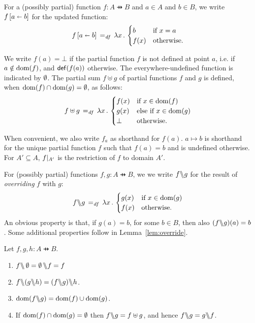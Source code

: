 \documentclass[11pt]{report}
\begin{document}
For a (possibly partial) function $f : A \pfun B$ and $a \in A$ and $b \in B$, we write $f \left[ a \shortleftarrow b \right]$ for the updated function: \[ f \left[ a \shortleftarrow b \right] \operatorname{\;=_{\mathit{df}}\;} \lambda x\,.\, \begin{cases}
  b & \text{if $x = a$} \\
  f(x) & \text{otherwise.}
\end{cases}\] 

We write $f(a) = \bot$ if the partial function $f$ is not defined at point $a$, i.e. if $a \notin \operatorname{\mathrm{dom}}(f)$, and $\mathsf{def}(f(a))$ otherwise. The everywhere-undefined function is indicated by $\operatorname{\emptyset}$. The partial sum $f \uplus g$ of partial functions $f$ and $g$ is defined, when $\operatorname{\mathrm{dom}}(f) \cap \operatorname{\mathrm{dom}}(g) = \operatorname{\emptyset}$, as follows: \[ f \uplus g \operatorname{\;=_{\mathit{df}}\;} \lambda x\,.\,\begin{cases}
    f(x) & \text{if $x \in \operatorname{\mathrm{dom}}(f)$} \\
    g(x) & \text{else if $x \in \operatorname{\mathrm{dom}}(g)$} \\
    \bot & \text{otherwise.}
\end{cases}\]

 When convenient, we also write $f_a$ as shorthand for $f(a)$. $a \mapsto b$ is shorthand for the unique partial function $f$ such that $f(a) = b$ and is undefined otherwise. For $A' \subseteq A$, $f |_{A'}$ is the restriction of $f$ to domain $A'$. 

For (possibly partial) functions $f,g : A \pfun B$, we we write $f \backslash\!\!\backslash g$ for the result of \emph{overriding} $f$ with $g$: \[ f \backslash\!\!\backslash g \operatorname{\;=_{\mathit{df}}\;} \lambda x\,.\, \begin{cases}
  g(x) & \text{if $x \in \operatorname{\mathrm{dom}}(g)$} \\
  f(x) & \text{otherwise.}
\end{cases} \] An obvious property is that, if $g(a) = b$, for some $b \in B$, then also $(f \backslash\!\!\backslash g)(a) = b$. Some additional properties follow in Lemma~\ref{lem:override}. 

\begin{lemma}
    \label{lem:override}
    Let $f,g,h : A \pfun B$. 
    \begin{enumerate}
        \item $f \backslash\!\!\backslash \operatorname{\emptyset} = \operatorname{\emptyset} \backslash\!\!\backslash f = f$
        \item $f \override (g \override h) = (f \override g) \override h$. 
        \item $\operatorname{\mathrm{dom}}(f \backslash\!\!\backslash g) = \operatorname{\mathrm{dom}}(f) \cup \operatorname{\mathrm{dom}}(g)$. 
        \item If $\operatorname{\mathrm{dom}}(f) \cap \operatorname{\mathrm{dom}}(g) = \operatorname{\emptyset}$ then $f \backslash\!\!\backslash g = f \uplus g$, and hence $f \backslash\!\!\backslash g = g \backslash\!\!\backslash f$. 
    \end{enumerate}
\end{lemma}
\end{document}
